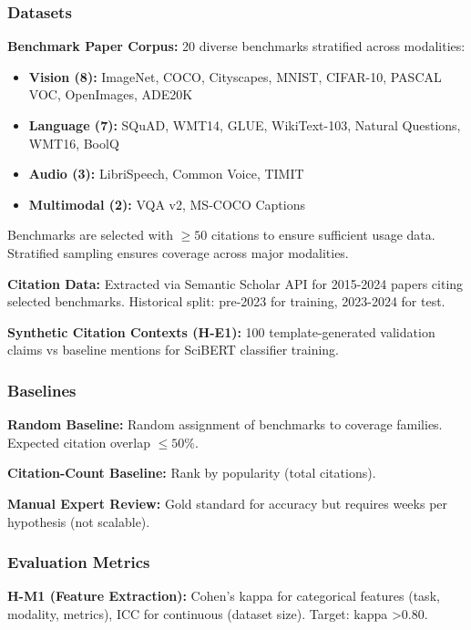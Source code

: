 
\subsubsection{Datasets}

\textbf{Benchmark Paper Corpus:} 20 diverse benchmarks stratified across modalities:

\begin{itemize}
\item \textbf{Vision (8):} ImageNet, COCO, Cityscapes, MNIST, CIFAR-10, PASCAL VOC, OpenImages, ADE20K
\item \textbf{Language (7):} SQuAD, WMT14, GLUE, WikiText-103, Natural Questions, WMT16, BoolQ
\item \textbf{Audio (3):} LibriSpeech, Common Voice, TIMIT
\item \textbf{Multimodal (2):} VQA v2, MS-COCO Captions
\end{itemize}

Benchmarks are selected with $\geq 50$ citations to ensure sufficient usage data. Stratified sampling ensures coverage across major modalities.

\textbf{Citation Data:} Extracted via Semantic Scholar API for 2015-2024 papers citing selected benchmarks. Historical split: pre-2023 for training, 2023-2024 for test.

\textbf{Synthetic Citation Contexts (H-E1):} 100 template-generated validation claims vs baseline mentions for SciBERT classifier training.

\subsubsection{Baselines}

\textbf{Random Baseline:} Random assignment of benchmarks to coverage families. Expected citation overlap $\leq 50$\%.

\textbf{Citation-Count Baseline:} Rank by popularity (total citations).

\textbf{Manual Expert Review:} Gold standard for accuracy but requires weeks per hypothesis (not scalable).

\subsubsection{Evaluation Metrics}

\textbf{H-M1 (Feature Extraction):} Cohen's kappa for categorical features (task, modality, metrics), ICC for continuous (dataset size). Target: kappa >0.80.

